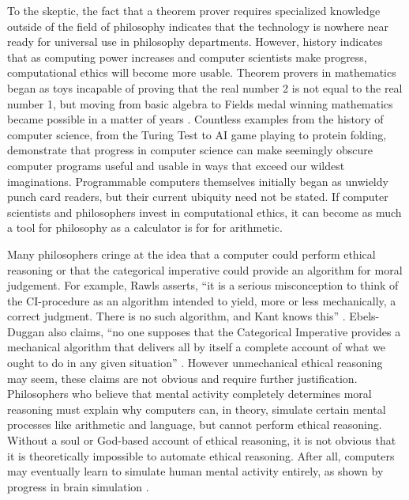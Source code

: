 \begin{isabellebody}
\begin{isamarkuptext}
To the skeptic, the fact that a theorem prover requires specialized knowledge outside of the field 
of philosophy indicates that the technology is nowhere near ready for universal use in philosophy 
departments. However, history indicates that as computing power increases and computer scientists make 
progress, computational ethics will become more usable. Theorem provers in mathematics began as toys 
incapable of proving that the real number 2 is not equal to the real number 1, but 
moving from basic algebra to Fields medal winning mathematics became possible in a
matter of years \citep{buzzardvideo}. Countless examples from the history of computer science, from the Turing 
Test to AI game playing to protein folding, demonstrate that progress in computer science can make seemingly 
obscure computer programs useful and usable in ways that exceed our wildest imaginations.
Programmable computers themselves initially began as unwieldy punch card readers, but their current ubiquity 
need not be stated. If computer scientists and philosophers invest in computational ethics, it can 
become as much a tool for philosophy as a calculator is for for arithmetic.%
\end{isamarkuptext}\isamarkuptrue%
%
\isadelimdocument
%
\endisadelimdocument
%
\isatagdocument
%
\isamarkuptrue%
%
\endisatagdocument
{\isafolddocument}%
%
\isadelimdocument
%
\endisadelimdocument
%
\begin{isamarkuptext}%
Many philosophers cringe at the idea that a computer could perform ethical reasoning or that the 
categorical imperative could provide an algorithm for moral judgement. For example, Rawls asserts, 
``it is a serious misconception to think of the CI-procedure as an algorithm intended to yield, 
more or less mechanically, a correct judgment. There is no such algorithm, and Kant knows this'' \citep[166]{rawlslectures}. 
Ebels-Duggan also claims, ``no one supposes that the Categorical Imperative provides a mechanical 
algorithm that delivers all by itself a complete account of what we ought to do in any given 
situation'' \citep[174]{ebelsduggan}. However unmechanical ethical reasoning
may seem, these claims are not obvious and require further justification. Philosophers who believe 
that mental activity completely determines moral reasoning must explain why computers can, in theory, 
simulate certain mental processes like arithmetic and language, but cannot perform ethical reasoning. 
Without a soul or God-based account of ethical reasoning, it is not obvious that it is theoretically 
impossible to automate ethical reasoning. After all, computers may eventually learn to simulate human 
mental activity entirely, as shown by progress in brain simulation \citep{brainsimulation}. 


\end{isamarkuptext}
\end{isabellebody}
